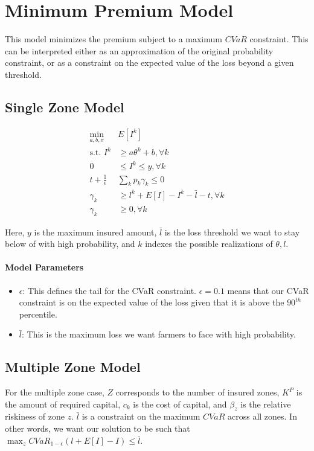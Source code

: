 \documentclass[11pt]{article}
\begin{document}
\section{Minimum Premium Model}
This model minimizes the premium subject to a maximum $CVaR$ constraint. This can be interpreted either as an approximation of the original probability constraint, or as a constraint on the expected value of the loss beyond a given threshold. 
\subsection*{Single Zone Model}
\begin{align}
    \min_{a,b,\pi} & E[I^k]\\
    \text{s.t.   } I^k &\geq a\theta^k + b, \forall k\\
    0 &\leq I^k \leq y, \forall k\\
    t + \frac{1}{\epsilon}&\sum_k p_k \gamma_k \leq 0\\
    \gamma_k &\geq l^k + E[I] -I^k -\bar{l} -t, \forall k\\
    \gamma_k &\geq 0, \forall k
\end{align}

Here, $y$ is the maximum insured amount, $\bar{l}$ is the loss threshold we want to stay below of with high probability, and $k$ indexes the possible realizations of $\theta, l$.
\paragraph*{Model Parameters}
\begin{itemize}
    \item $\epsilon$: This defines the tail for the CVaR constraint. $\epsilon = 0.1$ means that our CVaR constraint is on the expected value of the loss given that it is above the $90^{th}$ percentile. 
    \item $\bar{l}$: This is the maximum loss we want farmers to face with high probability.
\end{itemize}

\subsection*{Multiple Zone Model}
For the multiple zone case, $Z$ corresponds to the number of insured zones, $K^P$ is the amount of required capital, $c_k$ is the cost of capital, and $\beta_z$ is the relative riskiness of zone $z$. $\bar{l}$ is a constraint on the maximum $CVaR$ across all zones. In other words, we want our solution to be such that $\max_z CVaR_{1-\epsilon}(l+E[I]-I) \leq \bar{l}$. 
\end{document}
